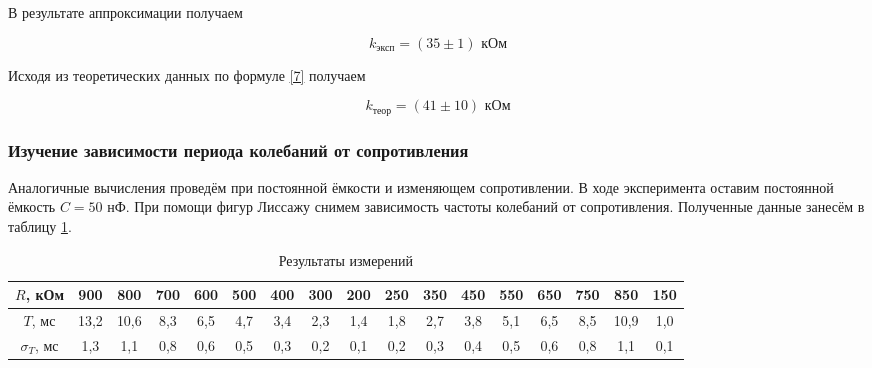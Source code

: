 \documentclass[a4paper,12pt]{article} %
\begin{document}
\begin{center}
\end{center}

В результате аппроксимации получаем

\[ \boxed{k_\text{эксп} = (35 \pm 1) \text{ кОм}} \]

Исходя из теоретических данных по формуле \eqref{7} получаем

\[ \boxed{k_\text{теор} = (41 \pm 10) \text{ кОм}} \]

\subsubsection{Изучение зависимости периода колебаний от сопротивления}

Аналогичные вычисления проведём при постоянной ёмкости и изменяющем сопротивлении. В ходе эксперимента оставим постоянной ёмкость $ C = 50 $ нФ. При помощи фигур Лиссажу снимем зависимость частоты колебаний от сопротивления. Полученные данные занесём в таблицу \ref{tab:tab5}.

\begin{table}[H]
	\centering
	\begin{tabular}{|c|c|c|c|c|c|c|c|c|c|c|c|c|c|c|c|c|}
		\hline
		$ R $, кОм     & 900  & 800  & 700 & 600 & 500 & 400 & 300 & 200 & 250 & 350 & 450 & 550 & 650 & 750 & 850  & 150 \\ \hline
		$ T $, мс     & 13,2 & 10,6 & 8,3 & 6,5 & 4,7 & 3,4 & 2,3 & 1,4 & 1,8 & 2,7 & 3,8 & 5,1 & 6,5 & 8,5 & 10,9 & 1,0 \\ \hline
		$ \sigma_T $, мс & 1,3  & 1,1  & 0,8 & 0,6 & 0,5 & 0,3 & 0,2 & 0,1 & 0,2 & 0,3 & 0,4 & 0,5 & 0,6 & 0,8 & 1,1  & 0,1 \\ \hline
	\end{tabular}
	\caption{Результаты измерений}
	\label{tab:tab5}
\end{table}
\end{document}
